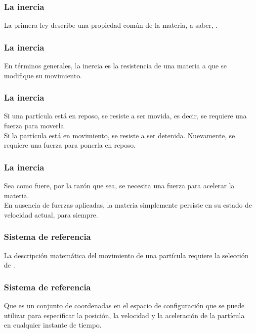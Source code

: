 \documentclass[12pt]{beamer}
\begin{document}
\begin{frame}
\frametitle{La inercia}
La primera ley describe una propiedad común de la materia, \pause a saber, .
\end{frame}
\begin{frame}
\frametitle{La inercia}
En términos generales, la inercia es la resistencia de una materia a que se modifique su movimiento.
\end{frame}
\begin{frame}
\frametitle{La inercia}
Si una partícula está en reposo, se resiste a ser movida, \pause es decir, se requiere una fuerza para moverla.
\\
\bigskip
\pause
Si la partícula está en movimiento, se resiste a ser detenida. \pause Nuevamente, se requiere una fuerza para ponerla en reposo.
\end{frame}
\begin{frame}
\frametitle{La inercia}
Sea como fuere, por la razón que sea, se necesita una fuerza para acelerar la materia.
\\
\bigskip
\pause
En ausencia de fuerzas aplicadas, la materia simplemente persiste en su estado de velocidad actual, para siempre.
\end{frame}
\begin{frame}
\frametitle{Sistema de referencia}
La descripción matemática del movimiento de una partícula requiere la selección de .
\end{frame}
\begin{frame}
\frametitle{Sistema de referencia}
Que es un conjunto de coordenadas en el espacio de configuración que se puede utilizar para especificar la posición, la velocidad y la aceleración de la partícula en cualquier instante de tiempo.
\end{frame}
\end{document}
